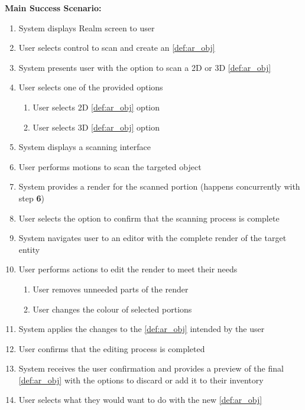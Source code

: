 \documentclass{article}
\begin{document}
\begin{enumerate}[label=\textbf{UC\arabic*}]
        \textbf{Main Success Scenario:}
        \begin{enumerate}[label=\textbf{\arabic*.}]
            \item System displays Realm screen to user
            \item User selects control to scan and create an \ref{def:ar_obj}
            \item System presents user with the option to scan a 2D or 3D \ref{def:ar_obj}
            \item User selects one of the provided options
            \begin{enumerate}[label=(\alph*)]
                \item User selects 2D \ref{def:ar_obj} option
                \item User selects 3D \ref{def:ar_obj} option
            \end{enumerate}
            \item System displays a scanning interface
            \item User performs motions to scan the targeted object
            \item System provides a render for the scanned portion (happens concurrently with step \textbf{6})
            \item User selects the option to confirm that the scanning process is complete
            \item System navigates user to an editor with the complete render of the target entity
            \item User performs actions to edit the render to meet their needs
            \begin{enumerate}[label=(\alph*)]
                \item User removes unneeded parts of the render
                \item User changes the colour of selected portions
            \end{enumerate}
            \item System applies the changes to the \ref{def:ar_obj} intended by the user
            \item User confirms that the editing process is completed
            \item System receives the user confirmation and provides a preview of the final \ref{def:ar_obj} with the options to discard or add it to their inventory
            \item User selects what they would want to do with the new \ref{def:ar_obj}

\end{enumerate}
\end{enumerate}
\end{document}
